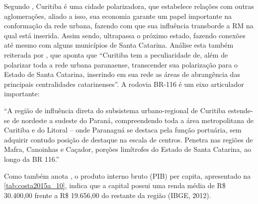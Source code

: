 	Segundo , Curitiba é uma cidade polarizadora, que estabelece relações com outras aglomerações, aliado a isso, sua economia garante um papel importante na conformação da rede urbana, fazendo com que sua influência transborde a RM na qual está inserida. Assim sendo, ultrapassa o próximo estado, fazendo conexões até mesmo com alguns municípios de Santa Catarina. Análise esta também reiterada por , que aponta que ``Curitiba tem a peculiaridade de, além de polarizar toda a rede urbana paranaense, transcender sua polarização para o Estado de Santa Catarina, inserindo em sua rede as áreas de abrangência das principais centralidades catarinenses''. A rodovia BR-116 é um eixo articulador importante:
	
	\begin{citacao}
		``A região de influência direta do subsistema urbano-regional de Curitiba estende-se de nordeste a sudeste do Paraná, compreendendo toda a área metropolitana de Curitiba e do Litoral – onde Paranaguá se destaca pela função portuária, sem adquirir contudo posição de destaque na escala de centros. Penetra nas regiões de Mafra, Canoinhas e Caçador, porções limítrofes do Estado de Santa Catarina, ao longo da BR 116.'' \cite[p. 43]{moura2001a}
	\end{citacao}
	
	Como também anota , o produto interno bruto (PIB) per capita, apresentado na \autoref{tab:costa2015a_10}, indica que a capital possui uma renda média de R\$ 30.400,00 frente a R\$ 19.656,00 do restante da região (IBGE, 2012).
	
